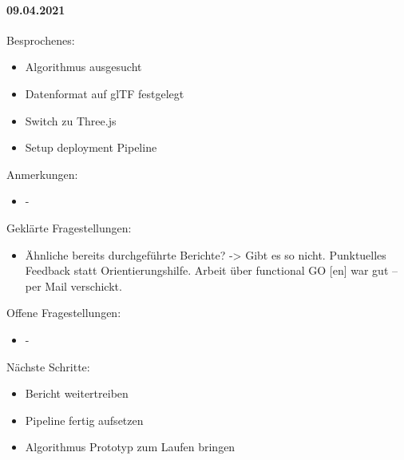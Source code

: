 \paragraph{09.04.2021}
Besprochenes:
\begin{itemize}
  \item Algorithmus ausgesucht
  \item Datenformat auf glTF festgelegt
  \item Switch zu Three.js
  \item Setup deployment Pipeline
\end{itemize}
Anmerkungen:
\begin{itemize}
  \item -
\end{itemize}
Geklärte Fragestellungen:
\begin{itemize}
  \item Ähnliche bereits durchgeführte Berichte? -> Gibt es so nicht. Punktuelles Feedback statt Orientierungshilfe. Arbeit über functional GO [en] war gut – per Mail verschickt.
\end{itemize}
Offene Fragestellungen:
\begin{itemize}
  \item -
\end{itemize}
Nächste Schritte:
\begin{itemize}
  \item Bericht weitertreiben
  \item Pipeline fertig aufsetzen
  \item Algorithmus Prototyp zum Laufen bringen
\end{itemize}

\newpage

